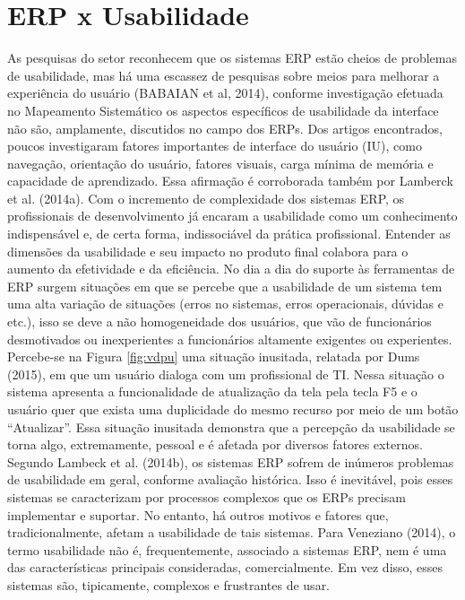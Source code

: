 \section{ERP x Usabilidade} \label{ERP x Usabilidade}

As pesquisas do setor reconhecem que os sistemas ERP estão cheios de problemas de usabilidade, mas há uma escassez de pesquisas sobre meios para melhorar a experiência do usuário (BABAIAN et al, 2014), conforme investigação efetuada no Mapeamento Sistemático os aspectos específicos de usabilidade da interface não são, amplamente, discutidos no campo dos ERPs. Dos artigos encontrados, poucos investigaram fatores importantes de interface do usuário (IU), como navegação, orientação do usuário, fatores visuais, carga mínima de memória e capacidade de aprendizado. Essa afirmação é corroborada também por Lamberck et al. (2014a).\newline
\indent Com o incremento de complexidade dos sistemas ERP, os profissionais de desenvolvimento já encaram a usabilidade como um conhecimento indispensável e, de certa forma, indissociável da prática profissional. Entender as dimensões da usabilidade e seu impacto no produto final colabora para o aumento da efetividade e da eficiência.\newline
\indent No dia a dia do suporte às ferramentas de ERP surgem situações em que se percebe que a usabilidade de um sistema tem uma alta variação de situações (erros no sistemas, erros operacionais, dúvidas e etc.), isso se deve a não homogeneidade dos usuários, que vão de funcionários desmotivados ou inexperientes a funcionários altamente exigentes ou experientes.\newline
\indent Percebe-se na Figura \ref{fig:vdpu} uma situação inusitada, relatada por Dums (2015), em que um usuário dialoga com um profissional de TI. Nessa situação o sistema apresenta a funcionalidade de atualização da tela pela tecla F5 e o usuário quer que exista uma duplicidade do mesmo recurso por meio de um botão “Atualizar”. Essa situação inusitada demonstra que a percepção da usabilidade se torna algo, extremamente, pessoal e é afetada por diversos fatores externos.\newline
\indent Segundo Lambeck et al. (2014b), os sistemas ERP sofrem de inúmeros problemas de usabilidade em geral, conforme avaliação histórica. Isso é inevitável, pois esses sistemas se caracterizam por processos complexos que os ERPs precisam implementar e suportar. No entanto, há outros motivos e fatores que, tradicionalmente, afetam a usabilidade de tais sistemas. Para Veneziano (2014), o termo usabilidade não é, frequentemente, associado a sistemas ERP, nem é uma das características principais consideradas, comercialmente. Em vez disso, esses sistemas são, tipicamente, complexos e frustrantes de usar.\newline
